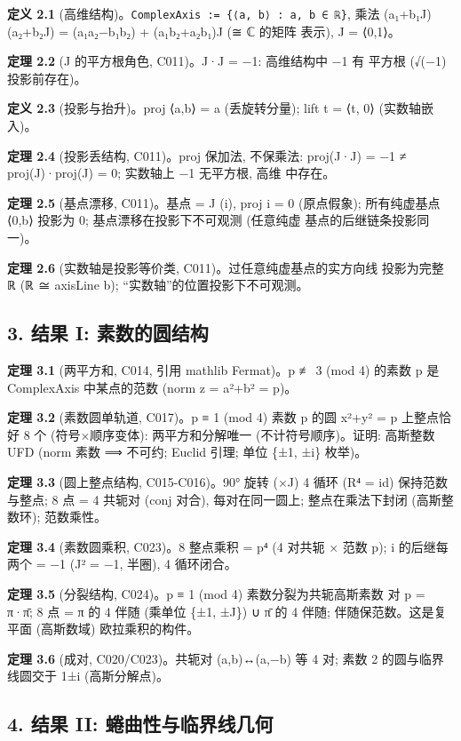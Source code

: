 \documentclass[
]{article}
\begin{document}
\textbf{定义 2.1}
(高维结构)。\texttt{ComplexAxis\ :=\ \{⟨a,\ b⟩\ :\ a,\ b\ ∈\ ℝ\}}, 乘法
(a₁+b₁J)(a₂+b₂J) = (a₁a₂−b₁b₂) + (a₁b₂+a₂b₁)J (≅ ℂ 的矩阵 表示), J =
⟨0,1⟩。

\textbf{定理 2.2} (J 的平方根角色, C011)。J·J = −1: 高维结构中 −1 有
平方根 (√(−1) 投影前存在)。

\textbf{定义 2.3} (投影与抬升)。proj ⟨a,b⟩ = a (丢旋转分量); lift t =
⟨t, 0⟩ (实数轴嵌入)。

\textbf{定理 2.4} (投影丢结构, C011)。proj 保加法, 不保乘法: proj(J·J) =
−1 ≠ proj(J)·proj(J) = 0; 实数轴上 −1 无平方根, 高维 中存在。

\textbf{定理 2.5} (基点漂移, C011)。基点 = J (i), proj i = 0 (原点假象);
所有纯虚基点 ⟨0,b⟩ 投影为 0; 基点漂移在投影下不可观测 (任意纯虚
基点的后继链条投影同一)。

\textbf{定理 2.6} (实数轴是投影等价类, C011)。过任意纯虚基点的实方向线
投影为完整 ℝ (ℝ ≅ axisLine b); ``实数轴''的位置投影下不可观测。

\subsection{3. 结果 I:
素数的圆结构}\label{ux7ed3ux679c-i-ux7d20ux6570ux7684ux5706ux7ed3ux6784}

\textbf{定理 3.1} (两平方和, C014, 引用 mathlib Fermat)。p ≢ 3 (mod 4)
的素数 p 是 ComplexAxis 中某点的范数 (norm z = a²+b² = p)。

\textbf{定理 3.2} (素数圆单轨道, C017)。p ≡ 1 (mod 4) 素数 p 的圆 x²+y²
= p 上整点恰好 8 个 (符号×顺序变体): 两平方和分解唯一
(不计符号顺序)。证明: 高斯整数 UFD (norm 素数 ⟹ 不可约; Euclid 引理;
单位 \{±1, ±i\} 枚举)。

\textbf{定理 3.3} (圆上整点结构, C015-C016)。90° 旋转 (×J) 4 循环 (R⁴ =
id) 保持范数与整点; 8 点 = 4 共轭对 (conj 对合), 每对在同一圆上;
整点在乘法下封闭 (高斯整数环); 范数乘性。

\textbf{定理 3.4} (素数圆乘积, C023)。8 整点乘积 = p⁴ (4 对共轭 × 范数
p); i 的后继每两个 = −1 (J² = −1, 半圈), 4 循环闭合。

\textbf{定理 3.5} (分裂结构, C024)。p ≡ 1 (mod 4) 素数分裂为共轭高斯素数
对 p = π·π̄; 8 点 = π 的 4 伴随 (乘单位 \{±1, ±J\}) ∪ π̄ 的 4 伴随;
伴随保范数。这是复平面 (高斯数域) 欧拉乘积的构件。

\textbf{定理 3.6} (成对, C020/C023)。共轭对 (a,b)↔(a,−b) 等 4 对; 素数 2
的圆与临界线圆交于 1±i (高斯分解点)。

\subsection{4. 结果 II:
蜷曲性与临界线几何}\label{ux7ed3ux679c-ii-ux8737ux66f2ux6027ux4e0eux4e34ux754cux7ebfux51e0ux4f55}
\end{document}
